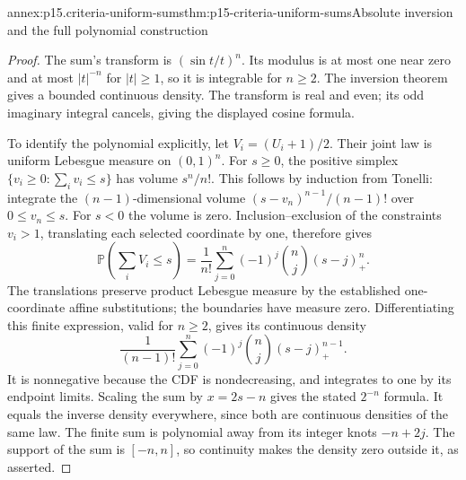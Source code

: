 \begin{annexitem}{annex:p15.criteria-uniform-sums}{thm:p15-criteria-uniform-sums}{Absolute inversion and the full polynomial construction}
\begin{proof}
The sum's transform is \((\sin t/t)^n\).
Its modulus is at most one near zero and at most
\(|t|^{-n}\) for \(|t|\geq1\), so it is integrable
for \(n\geq2\). The inversion theorem gives a bounded
continuous density. The transform is real and even;
its odd imaginary integral cancels, giving the displayed
cosine formula.

To identify the polynomial explicitly, let \(V_i=(U_i+1)/2\).
Their joint law is uniform Lebesgue measure on \((0,1)^n\).
For \(s\geq0\), the positive simplex
\(\{v_i\geq0:\sum_i v_i\leq s\}\) has volume \(s^n/n!\).
This follows by induction from Tonelli:
integrate the \((n-1)\)-dimensional volume
\((s-v_n)^{n-1}/(n-1)!\) over \(0\leq v_n\leq s\).
For \(s<0\) the volume is zero.
Inclusion--exclusion of the constraints \(v_i>1\),
translating each selected coordinate by one, therefore gives
\[
 \mathbb P\!\left(\sum_iV_i\leq s\right)
   =\frac1{n!}\sum_{j=0}^n(-1)^j\binom nj(s-j)_+^n.
\]
The translations preserve product Lebesgue measure by
the established one-coordinate affine substitutions;
the boundaries have measure zero.
Differentiating this finite expression, valid for
\(n\geq2\), gives its continuous density
\[
 \frac1{(n-1)!}\sum_{j=0}^n(-1)^j\binom nj(s-j)_+^{n-1}.
\]
It is nonnegative because the CDF is nondecreasing,
and integrates to one by its endpoint limits.
Scaling the sum by \(x=2s-n\) gives the stated
\(2^{-n}\) formula. It equals the inverse density
everywhere, since both are continuous densities of
the same law. The finite sum is polynomial away from
its integer knots \(-n+2j\). The support of the sum
is \([-n,n]\), so continuity makes the density zero
outside it, as asserted.
\end{proof}
\end{annexitem}

